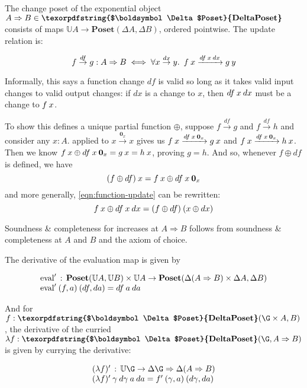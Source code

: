\documentclass{rntz}\usepackage[a5]{rntzgeometry}\usepackage[fullwidth=13cm,width=320pt,width=115mm]{narrow}
\newcommand\mathvar[1]{\ensuremath{#1}} %
\newcommand\cat\textbf
\newcommand\CP{\cat{\texorpdfstring{$\boldsymbol\Delta$Poset}{DeltaPoset}}}
\newcommand\Poset{\cat{Poset}}
\newcommand\expO[2]{#1 \Rightarrow #2}
\newcommand\D\Delta
\newcommand\x\times
\newcommand\fn\lambda
\newcommand\zero{\ensuremath{\mathbold{0}}}
\newcommand\<{\mskip 4mu plus 4mu minus 1mu}
\newcommand\da{\mathvar{da}}
\newcommand\dx{\mathvar{dx}}
\newcommand\df{\mathvar{df}}
\newcommand\fname\text
\newcommand\valfn{\ensuremath{\mathbb{U}}}
\newcommand\vals{\valfn}
\newcommand\chgs[1]{\D{#1}}
\newcommand\deriv[1]{\ensuremath{#1'}}
\newcommand\upd{\mathbin{\oplus}}
\newcommand\updfn{\ensuremath{{\upd}}}
\newcommand\quantifierspace{~\,}
\newcommand\fa[1]{\forall #1.\quantifierspace}
\newcommand\validarrow\to
\newcommand\valid[1]{\mathrel{\overset{#1}{\validarrow}}}
\newcommand\longvalid[1]{\mathrel{\xrightarrow{#1}}}
\newcommand\vld[3]{{#2 \valid{#1} #3}}
\newcommand\longvld[3]{{#2 \longvalid{#1} #3}}
\begin{document}
The change poset of the exponential object $\expO A B \in \CP$ consists of maps
$\vals A \to \Poset(\chgs A, \chgs B)$, ordered pointwise. The update relation
is:

\begin{equation}\label{eqn:function-update}
  f \valid\df g : \expO A B
  \iff \fa{x \valid\dx y} f\<x \longvalid{\df\<x\<\dx} g\<y
\end{equation}

\noindent Informally, this says a function change $\df$ is valid so long as it
takes valid input changes to valid output changes: if $\dx$ is a change to $x$,
then $\df\<x\<\dx$ must be a change to $f\<x$.

To show this defines a unique partial function \updfn, suppose $\vld\df f g$ and
$\vld\df f h$ and consider any $x : A$.  applied to
$\vld{\zero_x} x x$ gives us $\longvld{\df\<x\<\zero_x}{f\<x}{g\<x}$ and
$\longvld{\df\<x\<\zero_x}{f\<x}{h\<x}$. Then we know \(f\<x \upd
\df\<x\<\zero_x = g\<x = h\<x \), proving $g = h$. And so, whenever $f \upd \df$
is defined, we have
%
\[ (f \upd \df)\<x = f\<x \upd \df\<x\<\zero_x \]
%
and more generally, \cref{eqn:function-update} can be rewritten:
%
\begin{equation*}
  f\<x \upd \df\<x\<\dx = (f \upd \df)\<(x \upd \dx)
\end{equation*}

\noindent
Soundness \& completeness for increases at $\expO A B$ follows from soundness \&
completeness at $A$ and $B$ and the axiom of choice. %

The derivative of the evaluation map is given by

\[\begin{array}{l}
  \deriv{\fname{eval}} \,:\,
  \Poset(\vals A, \vals B)
  \x \vals A \to
  \Poset({\chgs{(\expO A B)} \x \chgs A},{\chgs B})
  \\
  \deriv{\fname{eval}} \<(f,a) \<(\df,\da) = \df\<a\<\da
\end{array}\]

\noindent
And for $f : \CP(\G \x A, B)$, the derivative of the curried $\fn f : \CP(\G,
\expO A B)$ is given by currying the derivative:

\[
\begin{array}{l}
  \deriv{(\fn f)} \,:\, \vals\G \to \expO{\chgs \G}{\chgs{(\expO A B)}}\\
  \deriv{(\fn f)} \<\gamma \<\mathvar{d\gamma} \<a \<\da
  = \deriv f \<(\gamma,a) \<(\mathvar{d\gamma}, \da)
\end{array}
\]
\end{document}
